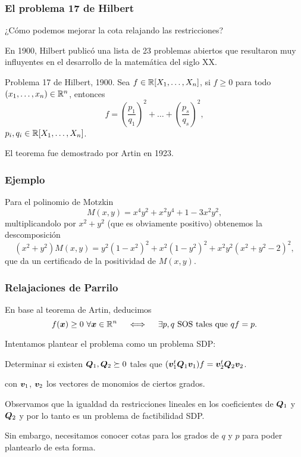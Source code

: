 \documentclass[aspectratio=169,12pt,spanish]{beamer}
\begin{document}
\begin{frame}

\frametitle{El problema 17 de Hilbert}

¿Cómo podemos mejorar la cota relajando las restricciones?

En 1900, Hilbert publicó una lista de 23 problemas abiertos que resultaron muy influyentes en el desarrollo de la matemática del siglo XX.

\begin{theorem}{Problema 17 de Hilbert, 1900.}
Sea $f \in \mathbb{R}[X_1, \dots, X_n]$, si $f \ge 0$ para todo $(x_1, \dots, x_n) \in \mathbb{R}^n$, entonces
\[
f = \left(\frac{p_1}{q_1}\right)^2 + \dots + \left(\frac{p_s}{q_s}\right)^2,
\]
$p_i, q_i \in \mathbb{R}[X_1, \dots, X_n]$.
\end{theorem}

El teorema fue demostrado por Artin en 1923.


\end{frame}


\begin{frame}

\frametitle{Ejemplo}

Para el polinomio de Motzkin
$$
M(x,y) = x^4y^2 + x^2 y^4 + 1 - 3x^2y^2,
$$
multiplicandolo por $x^2 + y^2$ (que es obviamente positivo) obtenemos la descomposición
$$
(x^2+y^2) M(x,y) = y^2(1-x^2)^2 + x^2(1-y^2)^2 + x^2y^2(x^2 + y^2-2)^2,
$$
que da un certificado de la positividad de $M(x,y)$.


\end{frame}


\begin{frame}

\frametitle{Relajaciones de Parrilo}

En base al teorema de Artin, deducimos
$$
f(\bm{x}) \ge 0 \ \forall \bm{x} \in \mathbb{R}^n \quad \iff \quad \exists p, q \text{ SOS tales que } qf = p.
$$

Intentamos plantear el problema como un problema SDP:
\begin{center}
Determinar si existen $\bm{Q}_1, \bm{Q}_2 \succeq 0$ tales que $(\bm{v}_1^t \bm{Q}_1 \bm{v}_1) f = \bm{v}_2^t \bm{Q}_2 \bm{v}_2$.
\end{center}
con $\bm{v}_1$, $\bm{v}_2$ los vectores de monomios de ciertos grados.

Observamos que la igualdad da restricciones lineales en los coeficientes de $\bm{Q}_1$ y $\bm{Q}_2$ y por lo tanto es un problema de factibilidad SDP.

Sin embargo, necesitamos conocer cotas para los grados de $q$ y $p$ para poder plantearlo de esta forma.

\end{frame}
\end{document}
